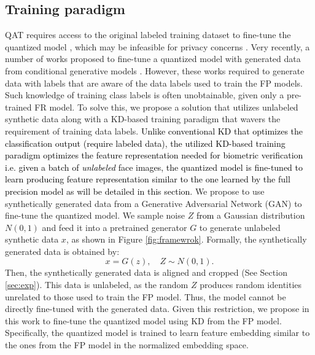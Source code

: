 \documentclass[a4paper,conference]{IEEEtran}
\begin{document}
\subsection{Training paradigm}
\vspace{-1mm}
QAT requires access to the original labeled training dataset to fine-tune the quantized model \cite{DBLP:conf/cvpr/JacobKCZTHAK18}, which may be infeasible for privacy concerns \cite{DBLP:conf/cvpr/ChoiCEL20}. 
Very recently, a number of works proposed to fine-tune a quantized model with generated data from conditional generative models \cite{jacob2018quantization,DBLP:conf/eccv/XuLZLCLT20}. 
However, these works \cite{jacob2018quantization,DBLP:conf/eccv/XuLZLCLT20} required to generate data with labels that are aware of the data labels used to train the FP models. 
Such knowledge of training class labels is often unobtainable, given only a pre-trained FR model.
To solve this, we propose a solution that utilizes unlabeled synthetic data along with a KD-based training paradigm that wavers the requirement of training data labels. 
\textcolor{black}{
Unlike conventional KD \cite{DBLP:journals/corr/HintonVD15} that optimizes the classification output (require labeled data), the utilized KD-based training paradigm optimizes the feature representation needed for biometric verification i.e. given a batch of \textit{unlabeled} face images, the quantized model is fine-tuned to learn producing feature representation similar to the one learned by the full precision model 
as will be detailed in this section. }
We propose to use synthetically generated data from a Generative Adversarial Network (GAN) \cite{gan,DBLP:conf/nips/KarrasAHLLA20} to fine-tune the quantized model.
We sample noise $Z$ \textcolor{black}{from} a Gaussian distribution $N(0,1)$ and feed it into a pretrained generator $G$ to generate unlabeled synthetic data $x$, as shown in Figure \ref{fig:framewrok}. Formally, the synthetically generated data is obtained by:
\vspace{-1mm}
\begin{equation}
   x= G(z),  \quad  Z \sim N(0,1). 
\end{equation}
Then, the synthetically generated data is aligned and cropped (See Section \ref{sec:exp}).
This data is unlabeled, as the random $Z$ produces random identities unrelated to those used to train the FP model. Thus, the model cannot be directly fine-tuned with the generated data.
Given this restriction, we propose in this work to fine-tune the quantized model using KD from the FP model. Specifically, the quantized model is trained to learn feature embedding similar to the ones from the FP model in the normalized embedding space. 
\end{document}
